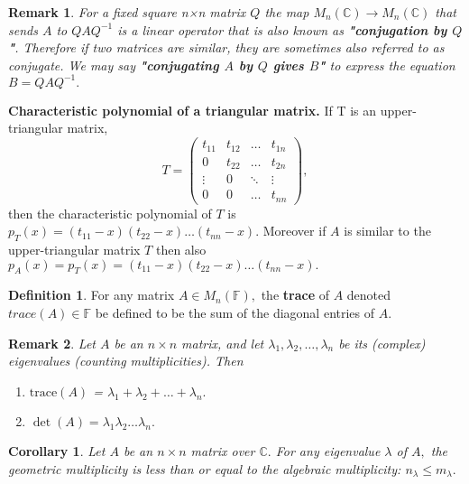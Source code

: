 \documentclass[12pt, a4paper]{article}
\newcommand{\bb}[1]{\mathbb{#1}}
\newtheorem*{remark}{Remark}
\theoremstyle{definition}
\newtheorem{definition}{Definition}[section]
\theoremstyle{plain}
\newtheorem{corollary}{Corollary}[theorem]
\begin{document}
\begin{remark}
For a fixed square n×n matrix $Q$ the map $M_n(\bb{C}) \to M_n(\bb{C})$ that sends $A$ to $QAQ^{-1}$ is a linear operator that is also known as \textbf{"conjugation by $Q$"}. Therefore if two matrices are similar, they are sometimes also referred to as conjugate. We may say \textbf{"conjugating $A$ by $Q$ gives $B$"} to express the equation $B = QAQ^{-1}.$
\end{remark}

\begin{tcolorbox}
\textbf{Characteristic polynomial of a triangular matrix.} If T is an upper-triangular matrix, $$T = \begin{pmatrix} t_{11} & t_{12} &\ldots& t_{1n} \\ 0&t_{22}&\ldots&t_{2n} \\ \vdots&0&\ddots& \vdots \\ 0&0& \ldots & t_{nn} \end{pmatrix},$$ then the characteristic polynomial of $T$ is $p_T(x)= (t_{11} - x)(t_{22} - x)\ldots(t_{nn} - x).$ Moreover if $A$ is similar to the upper-triangular matrix $T$ then also $p_A(x) = p_T(x)= (t_{11} - x)(t_{22} - x)\ldots(t_{nn} - x).$
\end{tcolorbox}

\begin{definition}
For any matrix $A \in M_n(\bb{F}),$ the \textbf{trace} of $A$ denoted $trace(A) \in \bb{F}$ be defined to be the sum of the diagonal entries of $A.$
\end{definition}

\begin{remark}
Let $A$ be an $n\times n$ matrix, and let $\lambda_1, \lambda_2,\ldots,\lambda_n$ be its (complex) eigenvalues (counting multiplicities). Then
\begin{enumerate}
	
	\item $\text{trace}(A)$ = $\lambda_1 +\lambda_2+\ldots+\lambda_n.$

	\item $\det(A)=\lambda_1\lambda_2\ldots\lambda_n.$

\end{enumerate}
\end{remark}

\begin{corollary}
Let $A$ be an $n \times n$ matrix over $\bb{C}.$ For any eigenvalue $\lambda$ of $A,$ the geometric multiplicity is less than or equal to the algebraic multiplicity: $n_\lambda \leq m_\lambda.$
\end{corollary}
\end{document}
